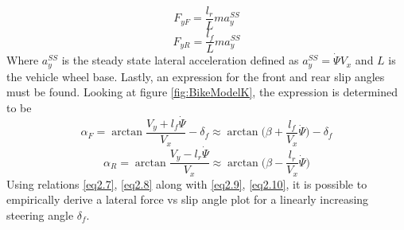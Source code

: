 \documentclass{article}
\numberwithin{equation}{section}
\begin{document}
\begin{equation}\label{eq2.7}
    F_{yF} = \frac{l_r}{L}ma_y^{SS}
\end{equation}
\begin{equation}\label{eq2.8}
    F_{yR} = \frac{l_f}{L}ma_y^{SS}
\end{equation}
Where $a_y^{SS}$ is the steady state lateral acceleration defined as $a_y^{SS} = \dot{\Psi} V_x$ and $L$ is the vehicle wheel base.
Lastly, an expression for the front and rear slip angles must be found. Looking at figure \ref{fig:BikeModelK}, the expression is determined to be
\begin{equation}\label{eq2.9}
    \alpha_F = \arctan\frac{V_y + l_f \dot{\Psi}}{V_x} - \delta_f \approx{\arctan\bigg(\beta + \frac{l_f}{V_x}\dot{\Psi}\bigg)-\delta_f}
\end{equation}
\begin{equation}\label{eq2.10}
    \alpha_R = \arctan\frac{V_y - l_r \dot{\Psi}}{V_x}\approx{\arctan\bigg(\beta - \frac{l_r}{V_x}\dot{\Psi}\bigg)}
\end{equation}
Using relations \eqref{eq2.7}, \eqref{eq2.8} along with \eqref{eq2.9}, \eqref{eq2.10}, it is possible to empirically derive a lateral force vs slip angle plot for a linearly increasing steering angle $\delta_f$.
\end{document}
